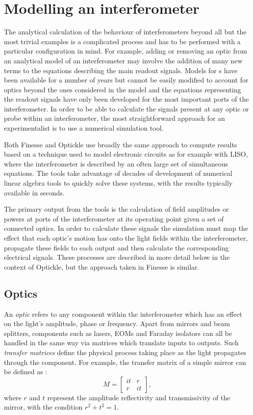 \section{\label{sec:ifo-modelling}Modelling an interferometer}
The analytical calculation of the behaviour of interferometers beyond all but the most trivial examples is a complicated process and has to be performed with a particular configuration in mind. For example, adding or removing an optic from an analytical model of an interferometer may involve the addition of many new terms to the equations describing the main readout signals. Models for \DRFPMI{}s have been available for a number of years \cite{Strain2003, Mueller2003, Mason2003} but cannot be easily modified to account for optics beyond the ones considered in the model and the equations representing the readout signals have only been developed for the most important ports of the interferometer. In order to be able to calculate the signals present at any optic or probe within an interferometer, the most straightforward approach for an experimentalist is to use a numerical simulation tool.

Both Finesse and Optickle use broadly the same approach to compute results based on a technique used to model electronic circuits as for example with \gls{LISO}, where the interferometer is described by an often large set of simultaneous equations. The tools take advantage of decades of development of numerical linear algebra tools to quickly solve these systems, with the results typically available in seconds.

The primary output from the tools is the calculation of field amplitudes or powers at ports of the interferometer at its operating point given a set of connected optics. In order to calculate these signals the simulation must map the effect that each optic's motion has onto the light fields within the interferometer, propagate these fields to each output and then calculate the corresponding electrical signals. These processes are described in more detail below in the context of Optickle, but the approach taken in Finesse is similar.

\subsection{Optics}
An \emph{optic} refers to any component within the interferometer which has an effect on the light's amplitude, phase or frequency. Apart from mirrors and beam splitters, components such as lasers, \glspl{EOM} and Faraday isolators can all be handled in the same way via matrices which translate inputs to outputs. Such \emph{transfer matrices} define the physical process taking place as the light propagates through the component. For example, the transfer matrix of a simple mirror can be defined as \cite{Freise2010}:
\begin{equation}
  M =
  \begin{bmatrix}
    it & r \\
    r & it
  \end{bmatrix},
\end{equation}
where $r$ and $t$ represent the amplitude reflectivity and transmissivity of the mirror, with the condition $r^2 + t^2 = 1$.

